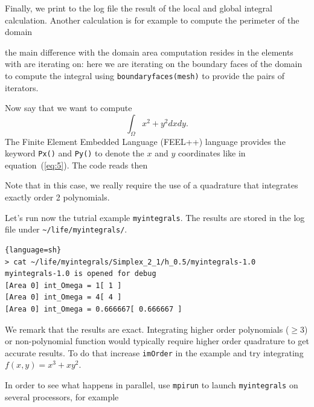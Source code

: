 \documentclass[a4paper]{book}
\begin{document}


\noindent
Finally, we print to the log file the result of the local and global
integral calculation. Another calculation is for example to compute
the perimeter of the domain



\noindent
the main difference with the domain area computation resides in the
elements with are iterating on: here we are iterating on the boundary
faces of the domain to compute the integral using
\lstinline!boundaryfaces(mesh)! to provide the pairs of iterators.


Now say that we want to compute
\begin{equation}
  \label{eq:5}
  \int_\Omega x^2 + y^2 dx dy.
\end{equation}
The Finite Element Embedded Language (FEEL++) language provides the
keyword \lstinline!Px()! and \lstinline!Py()! to denote the $x$ and
$y$ coordinates like in equation~(\ref{eq:5}).  The code reads then




Note that in this case, we really require the use of a quadrature that
integrates exactly order 2 polynomials.

Let's run now the tutrial example \lstinline!myintegrals!. The results are stored
in the log file under \lstinline!~/life/myintegrals/!.

\begin{lstlisting}{language=sh}
> cat ~/life/myintegrals/Simplex_2_1/h_0.5/myintegrals-1.0
myintegrals-1.0 is opened for debug
[Area 0] int_Omega = 1[ 1 ]
[Area 0] int_Omega = 4[ 4 ]
[Area 0] int_Omega = 0.666667[ 0.666667 ]
\end{lstlisting}

We remark that the results are exact. Integrating higher order
polynomials ($\geq 3$) or non-polynomial function would typically
require higher order quadrature to get accurate results. To do that
increase \lstinline!imOrder! in the example and try integrating
$f(x,y)=x^3 + x y^2$.


In order to see what happens in parallel, use \lstinline!mpirun! to
launch \lstinline!myintegrals! on several processors, for example
\end{document}

